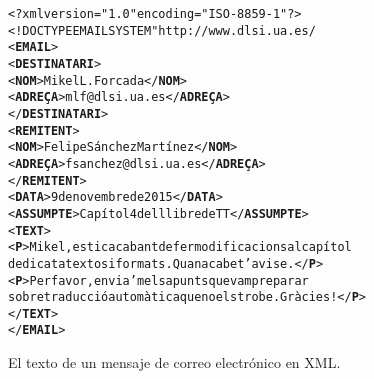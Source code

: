 \begin{figure}
\begin{center}
\begin{alltt}
<?xml version="1.0" encoding="ISO-8859-1"?>
<!DOCTYPE EMAIL SYSTEM "http://www.dlsi.ua.es/%7Efsanchez/tt/email.dtd">
<\textbf{EMAIL}>
  <\textbf{DESTINATARI}>
    <\textbf{NOM}>Mikel L. Forcada</\textbf{NOM}>
    <\textbf{ADREÇA}>mlf@dlsi.ua.es</\textbf{ADREÇA}>
  </\textbf{DESTINATARI}>
  <\textbf{REMITENT}>
    <\textbf{NOM}>Felipe Sánchez Martínez</\textbf{NOM}>
    <\textbf{ADREÇA}>fsanchez@dlsi.ua.es</\textbf{ADREÇA}>
  </\textbf{REMITENT}>
  <\textbf{DATA}>9 de novembre de 2015</\textbf{DATA}>
  <\textbf{ASSUMPTE}>Capítol 4 del llibre de TT</\textbf{ASSUMPTE}>
  <\textbf{TEXT}>
    <\textbf{P}>Mikel, estic acabant de fer modificacions al capítol 
    dedicat a textos i formats. Quan acabe t'avise.</\textbf{P}>
    <\textbf{P}>Per favor, envia'm els apunts que vam preparar 
    sobre traducció automàtica que no els trobe. Gràcies!</\textbf{P}>
  </\textbf{TEXT}>
</\textbf{EMAIL}>
\end{alltt}
\end{center}
\caption{El texto de un mensaje de correo electrónico en XML.}
\label{fg:faxXML}
\end{figure}

